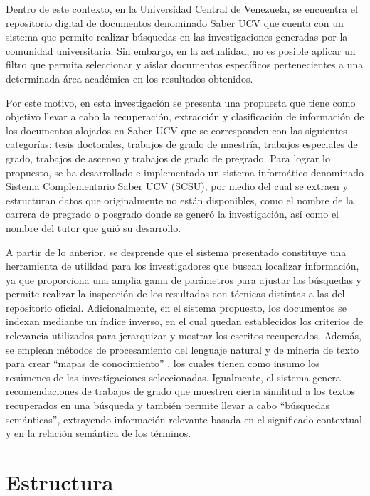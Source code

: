 \documentclass[
  12pt,
  openany]{book}
\begin{document}
Dentro de este contexto, en la Universidad Central de Venezuela, se encuentra el repositorio digital de documentos denominado Saber UCV que cuenta con un sistema que permite realizar búsquedas en las investigaciones generadas por la comunidad universitaria. Sin embargo, en la actualidad, no es posible aplicar un filtro que permita seleccionar y aislar documentos específicos pertenecientes a una determinada área académica en los resultados obtenidos.

Por este motivo, en esta investigación se presenta una propuesta que tiene como objetivo llevar a cabo la recuperación, extracción y clasificación de información de los documentos alojados en Saber UCV que se corresponden con las siguientes categorías: tesis doctorales, trabajos de grado de maestría, trabajos especiales de grado, trabajos de ascenso y trabajos de grado de pregrado. Para lograr lo propuesto, se ha desarrollado e implementado un sistema informático denominado Sistema Complementario Saber UCV (SCSU), por medio del cual se extraen y estructuran datos que originalmente no están disponibles, como el nombre de la carrera de pregrado o posgrado donde se generó la investigación, así como el nombre del tutor que guió su desarrollo.

A partir de lo anterior, se desprende que el sistema presentado constituye una herramienta de utilidad para los investigadores que buscan localizar información, ya que proporciona una amplia gama de parámetros para ajustar las búsquedas y permite realizar la inspección de los resultados con técnicas distintas a las del repositorio oficial. Adicionalmente, en el sistema propuesto, los documentos se indexan mediante un índice inverso, en el cual quedan establecidos los criterios de relevancia utilizados para jerarquizar y mostrar los escritos recuperados. Además, se emplean métodos de procesamiento del lenguaje natural y de minería de texto para crear ``mapas de conocimiento'' \citep{dueñas2011}, los cuales tienen como insumo los resúmenes de las investigaciones seleccionadas. Igualmente, el sistema genera recomendaciones de trabajos de grado que muestren cierta similitud a los textos recuperados en una búsqueda y también permite llevar a cabo ``búsquedas semánticas'', extrayendo información relevante basada en el significado contextual y en la relación semántica de los términos.

\hypertarget{estructura}{%
\section{Estructura}\label{estructura}}
\end{document}
